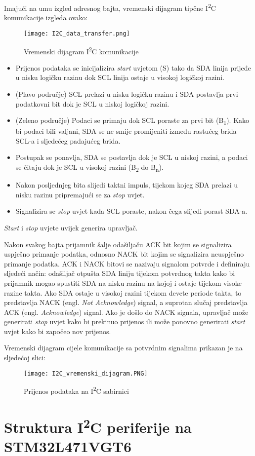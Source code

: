 Imajući na umu izgled adresnog bajta, vremenski dijagram tipčne
I\textsuperscript{2}C komunikacije izgleda ovako:
\begin{figure}[hp]
	\centering
	\texttt{[image: I2C\_data\_transfer.png]}
	\caption{Vremenski dijagram I\textsuperscript{2}C komunikacije}
	\label{fig:i2c_timing_diagram}
\end{figure}
\begin{itemize}
	\item Prijenos podataka se inicijalizira \textit{start} uvjetom (S) tako da
	SDA linija prijeđe u nisku logičku razinu dok SCL linija ostaje u visokoj
	logičkoj razini.
	\item (Plavo područje) SCL prelazi u nisku logičku razinu i SDA postavlja
	prvi podatkovni bit dok je SCL u niskoj logičkoj razini.
	\item (Zeleno područje) Podaci se primaju dok SCL poraste za prvi bit
	(B\textsubscript{1}). Kako bi podaci bili valjani, SDA se ne smije
	promijeniti između rastućeg brida SCL-a i sljedećeg padajućeg brida.
	\item Postupak se ponavlja, SDA se postavlja dok je SCL u niskoj razini, a
	podaci se čitaju dok je SCL u visokoj razini (B\textsubscript{2} do
	B\textsubscript{n}).
	\item Nakon posljednjeg bita slijedi taktni impuls, tijekom kojeg SDA
	prelazi u nisku razinu pripremajući se za \textit{stop} uvjet.
	\item Signalizira se \textit{stop} uvjet kada SCL poraste, nakon čega
	slijedi porast SDA-a.
\end{itemize}
\textit{Start} i \textit{stop} uvjete uvijek generira upravljač.

Nakon svakog bajta prijamnik šalje odašiljaču ACK bit kojim se signalizira
uspješno primanje podatka, odnosno NACK bit kojim se signalizira neuspješno
primanje podatka. ACK i NACK bitovi se nazivaju signalom potvrde i definiraju
sljedeći način: odašiljač otpušta SDA liniju tijekom potvrdnog takta kako bi
prijamnik mogao spustiti SDA na nisku razinu na kojoj i ostaje tijekom visoke
razine takta. Ako SDA ostaje u visokoj razini tijekom devete periode takta, to
predstavlja NACK (engl. \textit{Not Acknowledge}) signal, a suprotan slučaj
predstavlja ACK (engl. \textit{Acknowledge}) signal. Ako je došlo do NACK
signala, upravljač može generirati \textit{stop} uvjet kako bi prekinuo prijenos
ili može ponovno generirati \textit{start} uvjet kako bi započeo nov prijenos.

Vremenski dijagram cijele komunikacije sa potvrdnim signalima prikazan je na
sljedećoj slici:
\begin{figure}[hp]
	\centering
	\texttt{[image: I2C\_vremenski\_dijagram.PNG]}
	\caption{Prijenos podataka na I\textsuperscript{2}C sabirnici}
	\label{fig:i2c_timing_diagram_transaction}
\end{figure}

\section{Struktura I\textsuperscript{2}C periferije na STM32L471VGT6}